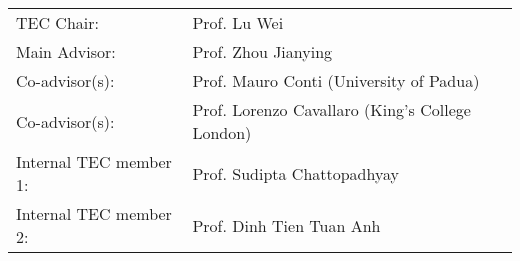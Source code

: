 \documentclass[
11pt, %
oneside, %
english, %
singlespacing, %
headsepline, %
]{MastersDoctoralThesis} %
\begin{document}
\begin{tec}
\addchaptertocentry{\tecname}
\begin{tabular}{ll}
	TEC Chair: & Prof. Lu Wei \\
	Main Advisor: & Prof. Zhou Jianying \\
	Co-advisor(s): & Prof. Mauro Conti (University of Padua) \\
	Co-advisor(s): & Prof. Lorenzo Cavallaro (King's College London) \\
	Internal TEC member 1: & Prof. Sudipta Chattopadhyay \\
	Internal TEC member 2: & Prof. Dinh Tien Tuan Anh \\
\end{tabular}
\end{tec}
\vfill\eject



%
\end{document}
